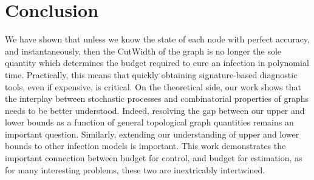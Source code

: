 \section{Conclusion}
We have shown that unless we know the state of each node with perfect accuracy, and instantaneously, then the {\sc CutWidth} of the graph is no longer the sole quantity which determines the budget required to cure an infection in polynomial time. Practically, this means that quickly obtaining signature-based diagnostic tools, even if expensive, is critical. On the theoretical side, our work shows that the interplay between stochastic processes and combinatorial properties of graphs needs to be better understood. Indeed, resolving the gap between our upper and lower bounds as a function of general topological graph quantities remains an important question. Similarly, extending our understanding of upper and lower bounds to other infection models is important. This work demonstrates the important connection between budget for control, and budget for estimation, as for many interesting problems, these two are inextricably intertwined. 